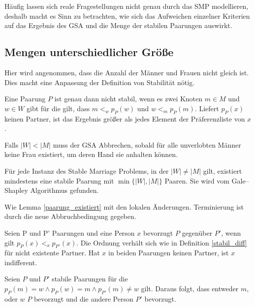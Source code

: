 Häufig lassen sich reale Fragestellungen nicht genau durch das SMP modellieren, deshalb macht es Sinn  zu betrachten, wie sich das Aufweichen einzelner Kriterien auf das Ergebnis des GSA und die Menge der stabilen Paarungen auswirkt.

\subsection{Mengen unterschiedlicher Größe}
\label{subsec:size}

Hier wird angenommen, dass die Anzahl der Männer und Frauen nicht gleich ist. Dies macht eine Anpassung der Definition von Stabilität nötig.

\begin{Definition}
\label{stabil_diff}
  Eine Paarung $P$ ist genau dann nicht stabil, wenn es zwei Knoten $m \in M$ und $w \in W$ gibt für die gilt, dass $m <_{w} p_{P}(w)$ und $w <_{m} p_{P}(m)$. Liefert $p_{P}(x)$ keinen Partner, ist das Ergebnis größer als jedes Element der Präferenzliste von $x$.
\end{Definition}

Falls $|W| < |M|$ muss der GSA Abbrechen, sobald für alle unverlobten Männer keine Frau existiert, um deren Hand sie anhalten können.

\begin{Theorem}
\label{paarung_existiert_diff}
  Für jede Instanz des Stable Marriage Problems, in der $|W| \neq |M|$ gilt, existiert mindestens eine stabile Paarung mit $\min\{|W|,|M|\}$ Paaren. Sie wird vom Gale–Shapley Algorithmus gefunden.
\end{Theorem}

\begin{Beweis}
\label{paarung_existiert_diff_bew}
  Wie Lemma \ref{paarung_existiert} mit den lokalen Änderungen. Terminierung ist durch die neue Abbruchbedingung gegeben.
\end{Beweis}

\begin{Definition}
\label{vorziehen}
  Seien P und P' Paarungen und eine Person $x$ bevorzugt $P$ gegenüber $P'$, wenn gilt $p_{P}(x) <_{x} p_{P'}(x)$. Die Ordnung verhält sich wie in Definition \ref{stabil_diff} für nicht existente Partner. Hat $x$ in beiden Paarungen keinen Partner, ist $x$ indifferent.
\end{Definition}

\begin{Lemma}
\label{strikte_ordnung}
  Seien $P$ und $P'$ stabile Paarungen für die $p_{P}(m) = w \land p_{P}(w) = m \land p_{P'}(m) \neq w$ gilt. Daraus folgt, dass entweder $m$, oder $w$ $P$ bevorzugt und die andere Person $P'$ bevorzugt.
\end{Lemma}


